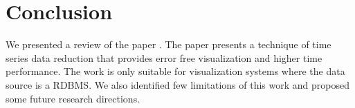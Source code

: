\section{Conclusion}
We presented a review of the paper \cite{jugel2014m4}. The paper presents a technique of time series data reduction that provides error free visualization and higher time performance. The work is only suitable for visualization systems where the data source is 
a RDBMS. We also identified few limitations of this work and proposed some future research directions. 